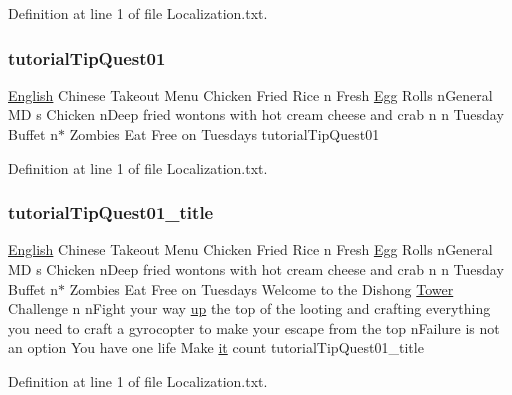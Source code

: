Definition at line 1 of file Localization.\+txt.

\mbox{\label{_dishong_01_tower_01_challenge_2_config_2_localization_8txt_ab9f78a0790e5a6b92fc724fe5adb3d40}} 
\subsubsection{\texorpdfstring{tutorialTipQuest01}{tutorialTipQuest01}}
{\footnotesize\ttfamily \mbox{\hyperlink{_sphere_i_i_01_winter_01_project_2_config_2_localization_8txt_ad896b63205779b1b09e86d941ce13976}{English}} Chinese Takeout Menu Chicken Fried Rice n Fresh \mbox{\hyperlink{_sphere_i_i_01_winter_01_project_2_config_2_localization_8txt_a55334ab0b48a68a93004334728020f15}{Egg}} Rolls n\+General MD s Chicken n\+Deep fried wontons with hot cream cheese and crab n n Tuesday Buffet n$\ast$ Zombies Eat Free on Tuesdays tutorial\+Tip\+Quest01}



Definition at line 1 of file Localization.\+txt.

\mbox{\label{_dishong_01_tower_01_challenge_2_config_2_localization_8txt_a310857bad9c20b1fad8f32ef58eff69d}} 
\subsubsection{\texorpdfstring{tutorialTipQuest01\_title}{tutorialTipQuest01\_title}}
{\footnotesize\ttfamily \mbox{\hyperlink{_sphere_i_i_01_winter_01_project_2_config_2_localization_8txt_ad896b63205779b1b09e86d941ce13976}{English}} Chinese Takeout Menu Chicken Fried Rice n Fresh \mbox{\hyperlink{_sphere_i_i_01_winter_01_project_2_config_2_localization_8txt_a55334ab0b48a68a93004334728020f15}{Egg}} Rolls n\+General MD s Chicken n\+Deep fried wontons with hot cream cheese and crab n n Tuesday Buffet n$\ast$ Zombies Eat Free on Tuesdays Welcome to the Dishong \mbox{\hyperlink{_dishong_01_tower_01_challenge_2_config_2_localization_8txt_ad03a7286db82f171f8e82a1eaf4e3eaf}{Tower}} Challenge n n\+Fight your way \mbox{\hyperlink{_the_01_restless_01_curse_2_config_2_localization_01-_01_quest_8txt_a2f8d5a9cc6c08e259de10d34d28f85c4}{up}} the top of the looting and crafting everything you need to craft a gyrocopter to make your escape from the top n\+Failure is not an option You have one life Make \mbox{\hyperlink{_the_01_restless_01_curse_2_config_2_localization_01-_01_quest_8txt_a741b285909bea4855b886664c2dcd50c}{it}} count tutorial\+Tip\+Quest01\+\_\+title}



Definition at line 1 of file Localization.\+txt.

